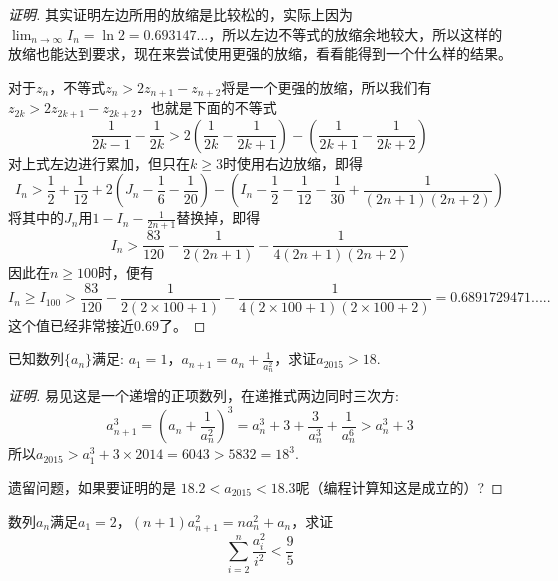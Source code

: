 \begin{proof}[证明]
其实证明左边所用的放缩是比较松的，实际上因为$\lim_{n\to\infty}I_n=\ln{2}=0.693147...$，所以左边不等式的放缩余地较大，所以这样的放缩也能达到要求，现在来尝试使用更强的放缩，看看能得到一个什么样的结果。

对于$z_{n}$，不等式$z_n>2z_{n+1}-z_{n+2}$将是一个更强的放缩，所以我们有$z_{2k}>2z_{2k+1}-z_{2k+2}$，也就是下面的不等式
\begin{equation*}
  \frac{1}{2k-1}-\frac{1}{2k} > 2 \left( \frac{1}{2k}-\frac{1}{2k+1} \right) - \left( \frac{1}{2k+1}-\frac{1}{2k+2} \right)
\end{equation*}
对上式左边进行累加，但只在$k\geqslant 3$时使用右边放缩，即得
\begin{equation*}
  I_n > \frac{1}{2}+\frac{1}{12} + 2 \left( J_n-\frac{1}{6}-\frac{1}{20} \right) - \left( I_n-\frac{1}{2}-\frac{1}{12}-\frac{1}{30}+\frac{1}{(2n+1)(2n+2)} \right)
\end{equation*}
将其中的$J_{n}$用$1-I_n-\frac{1}{2n+1}$替换掉，即得
\begin{equation*}
  I_n>\frac{83}{120}-\frac{1}{2(2n+1)}-\frac{1}{4(2n+1)(2n+2)}
\end{equation*}
因此在$n \geqslant 100$时，便有
\begin{equation*}
  I_n \geqslant I_{100} > \frac{83}{120}-\frac{1}{2(2\times 100+1)}-\frac{1}{4(2\times 100+1)(2 \times 100 + 2)} = 0.6891729471.....
\end{equation*}
这个值已经非常接近$0.69$了。
\end{proof}

\begin{exercise}
  已知数列$\{a_n\}$满足: $a_1=1$，$a_{n+1}=a_n+\frac{1}{a_n^2}$，求证$a_{2015}>18$.
\end{exercise}

\begin{proof}[证明]
  易见这是一个递增的正项数列，在递推式两边同时三次方:
  \begin{equation*}
    a_{n+1}^3=\left( a_n+\frac{1}{a_n^2} \right)^3 = a_n^3+3+\frac{3}{a_n^3}+\frac{1}{a_n^6}>a_n^3+3
  \end{equation*}
  所以$a_{2015}>a_1^3+3\times 2014=6043 > 5832 = 18^3$.

  遗留问题，如果要证明的是 $18.2<a_{2015}<18.3$呢（编程计算知这是成立的）?
\end{proof}

\begin{exercise}
  数列$a_n$满足$a_1=2$，$(n+1)a_{n+1}^2=na_n^2+a_n$，求证
  \[ \sum_{i=2}^n \frac{a_i^2}{i^2}<\frac{9}{5} \]
\end{exercise}

